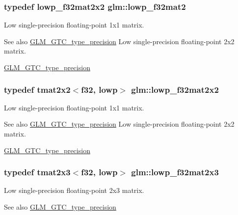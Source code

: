 \subsubsection[{lowp\+\_\+f32mat2}]{\setlength{\rightskip}{0pt plus 5cm}typedef {\bf lowp\+\_\+f32mat2x2} {\bf glm\+::lowp\+\_\+f32mat2}}\label{namespaceglm_ad717448ef1129d7b795ebcfee6c4944c}
Low single-\/precision floating-\/point 1x1 matrix. \begin{DoxySeeAlso}{See also}
\hyperlink{group__gtc__type__precision}{G\+L\+M\+\_\+\+G\+T\+C\+\_\+type\+\_\+precision} Low single-\/precision floating-\/point 2x2 matrix. 

\hyperlink{group__gtc__type__precision}{G\+L\+M\+\_\+\+G\+T\+C\+\_\+type\+\_\+precision} 
\end{DoxySeeAlso}
\hypertarget{namespaceglm_ab9e4eb16dafb8cb18d411490d8ccc611}{}
\subsubsection[{lowp\+\_\+f32mat2x2}]{\setlength{\rightskip}{0pt plus 5cm}typedef tmat2x2$<${\bf f32}, lowp$>$ {\bf glm\+::lowp\+\_\+f32mat2x2}}\label{namespaceglm_ab9e4eb16dafb8cb18d411490d8ccc611}
Low single-\/precision floating-\/point 1x1 matrix. \begin{DoxySeeAlso}{See also}
\hyperlink{group__gtc__type__precision}{G\+L\+M\+\_\+\+G\+T\+C\+\_\+type\+\_\+precision} Low single-\/precision floating-\/point 2x2 matrix. 

\hyperlink{group__gtc__type__precision}{G\+L\+M\+\_\+\+G\+T\+C\+\_\+type\+\_\+precision} 
\end{DoxySeeAlso}
\hypertarget{namespaceglm_a952a42800932ee1d55415c1045f041fd}{}
\subsubsection[{lowp\+\_\+f32mat2x3}]{\setlength{\rightskip}{0pt plus 5cm}typedef tmat2x3$<${\bf f32}, lowp$>$ {\bf glm\+::lowp\+\_\+f32mat2x3}}\label{namespaceglm_a952a42800932ee1d55415c1045f041fd}
Low single-\/precision floating-\/point 2x3 matrix. \begin{DoxySeeAlso}{See also}
\hyperlink{group__gtc__type__precision}{G\+L\+M\+\_\+\+G\+T\+C\+\_\+type\+\_\+precision} 
\end{DoxySeeAlso}
\hypertarget{namespaceglm_a61927ceea97a94ec30f22de589342891}{}

